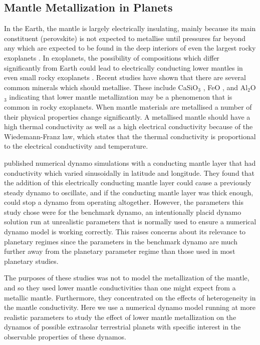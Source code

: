 \subsection{Mantle Metallization in Planets}
In the Earth, the mantle is largely electrically insulating, mainly because its main constituent (perovskite) is not expected to metallise until pressures far beyond any which are expected to be found in the deep interiors of even the largest rocky exoplanets \citep{tsuchiya2011}. In exoplanets, the possibility of compositions which differ significantly from Earth could lead to electrically conducting lower mantles in even small rocky exoplanets \citep{ohta2012}. Recent studies have shown that there are several common minerals which should metallise. These include CaSiO$_{3}$ \citep{tsuchiya2011}, FeO \citep{ohta2012}, and Al$_{2}$O$_{3}$ \citep{nellis2010} indicating that lower mantle metallization may be a phenomenon that is common in rocky exoplanets. When mantle materials are metallised a number of their physical properties change significantly. A metallised mantle should have a high thermal conductivity as well as a high electrical conductivity because of the Wiedemann-Franz law, which states that the thermal conductivity is proportional to the electrical conductivity and temperature.

\citet{chan2008} published numerical dynamo simulations with a conducting mantle layer that had  conductivity which varied sinusoidally in latitude and longitude. They found that the addition of this electrically conducting mantle layer could cause a previously steady dynamo to oscillate, and if the conducting mantle layer was thick enough, could stop a dynamo from operating altogether. However, the parameters this study chose were for the benchmark dynamo, an intentionally placid dynamo solution run at unrealistic parameters that is normally used to ensure a numerical dynamo model is working correctly. This raises concerns about its relevance to planetary regimes since the parameters in the benchmark dynamo are much further away from the planetary parameter regime than those used in most planetary studies.

The purposes of these studies was not to model the metallization of the mantle, and so they used lower mantle conductivities than one might expect from a metallic mantle. Furthermore, they concentrated on the effects of heterogeneity in the mantle conductivity. Here we use a numerical dynamo model running at more realistic parameters to study the effect of lower mantle metallization on the dynamos of possible extrasolar terrestrial planets with specific interest in the observable properties of these dynamos.

